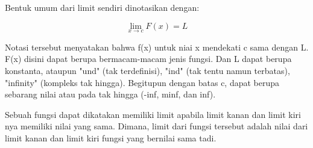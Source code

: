 \documentclass[a4paper,10pt]{article}
\begin{document}
\begin{eulernotebook}
\begin{eulercomment}
\begin{eulercomment}
\begin{eulercomment}
Bentuk umum dari limit sendiri dinotasikan dengan:

\end{eulercomment}
\begin{eulerformula}
\[
\lim_{x\rightarrow c}{F\left(x\right)}=L
\]
\end{eulerformula}
\begin{eulercomment}
Notasi tersebut menyatakan bahwa f(x) untuk niai x mendekati c sama
dengan L. F(x) disini dapat berupa bermacam-macam jenis fungsi. Dan L
dapat berupa konstanta, ataupun "und" (tak terdefinisi), "ind" (tak
tentu namun terbatas), "infinity" (kompleks tak hingga). Begitupun
dengan batas c, dapat berupa sebarang nilai atau pada tak hingga
(-inf, minf, dan inf).

Sebuah fungsi dapat dikatakan memiliki limit apabila limit kanan dan
limit kiri nya memiliki nilai yang sama. Dimana, limit dari fungsi
tersebut adalah nilai dari limit kanan dan limit kiri fungsi yang
bernilai sama tadi.


\end{eulercomment}
\end{eulercomment}
\end{eulercomment}
\end{eulernotebook}
\end{document}
